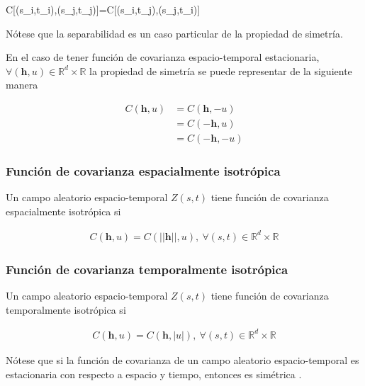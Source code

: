 \documentclass[
]{book}
\begin{document}
C{[}(s\_i,t\_i),(s\_j,t\_j){]}=C{[}(s\_i,t\_j),(s\_j,t\_i){]}

Nótese que la separabilidad es un caso particular de la propiedad de simetría.

En el caso de tener función de covarianza espacio-temporal estacionaria, \(\forall (\textbf{h},u)\in \mathbb{R}^d \times \mathbb{R}\) la propiedad de simetría se puede representar de la siguiente manera

\begin{align}
C(\textbf{h}, u)&=C(\textbf{h},-u)\\
&=C(-\textbf{h}, u)\\
&=C(-\textbf{h}, -u)
\end{align}

\hypertarget{funciuxf3n-de-covarianza-espacialmente-isotruxf3pica}{%
\subsubsection*{Función de covarianza espacialmente isotrópica}\label{funciuxf3n-de-covarianza-espacialmente-isotruxf3pica}}

Un campo aleatorio espacio-temporal \(Z(s,t)\) tiene función de covarianza espacialmente isotrópica si

\begin{align}
C(\textbf{h},u)=C(||\textbf{h}||,u), \ \forall(s,t) \in \mathbb{R}^d \times \mathbb{R}
\end{align}

\hypertarget{funciuxf3n-de-covarianza-temporalmente-isotruxf3pica}{%
\subsubsection*{Función de covarianza temporalmente isotrópica}\label{funciuxf3n-de-covarianza-temporalmente-isotruxf3pica}}

Un campo aleatorio espacio-temporal \(Z(s,t)\) tiene función de covarianza temporalmente isotrópica si

\begin{align}
C(\textbf{h},u)=C(\textbf{h},|u|), \ \forall(s,t) \in \mathbb{R}^d \times \mathbb{R}
\end{align}

Nótese que si la función de covarianza de un campo aleatorio espacio-temporal es estacionaria con respecto a espacio y tiempo, entonces es simétrica \citep{montero}.
\end{document}
